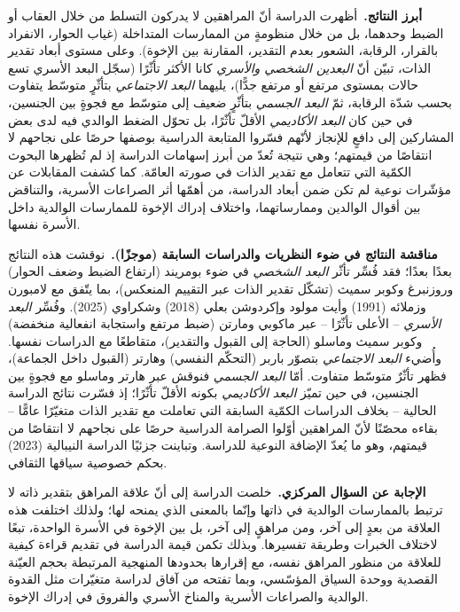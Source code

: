 \medskip
\noindent\textbf{أبرز النتائج.}\ أظهرت الدراسة أنّ المراهقين لا يدركون التسلط من خلال العقاب أو
الضبط وحدهما، بل من خلال منظومةٍ من الممارسات المتداخلة (غياب الحوار، الانفراد بالقرار، الرقابة،
الشعور بعدم التقدير، المقارنة بين الإخوة). وعلى مستوى أبعاد تقدير الذات، تبيّن أنّ \emph{البعدين
الشخصي والأسري} كانا الأكثر تأثّرًا (سجّل البعد الأسري تسع حالات بمستوى مرتفع أو مرتفع جدًّا)،
يليهما \emph{البعد الاجتماعي} بتأثّرٍ متوسّط يتفاوت بحسب شدّة الرقابة، ثمّ \emph{البعد الجسمي}
بتأثّرٍ ضعيف إلى متوسّط مع فجوةٍ بين الجنسين، في حين كان \emph{البعد الأكاديمي} الأقلّ تأثّرًا، بل
تحوّل الضغط الوالدي فيه لدى بعض المشاركين إلى دافعٍ للإنجاز لأنّهم فسّروا المتابعة الدراسية بوصفها
حرصًا على نجاحهم لا انتقاصًا من قيمتهم؛ وهي نتيجة تُعدّ من أبرز إسهامات الدراسة إذ لم تُظهرها
البحوث الكمّية التي تتعامل مع تقدير الذات في صورته العامّة. كما كشفت المقابلات عن مؤشّرات نوعية لم
تكن ضمن أبعاد الدراسة، من أهمّها أثر الصراعات الأسرية، والتناقض بين أقوال الوالدين وممارساتهما،
واختلاف إدراك الإخوة للممارسات الوالدية داخل الأسرة نفسها.

\medskip
\noindent\textbf{مناقشة النتائج في ضوء النظريات والدراسات السابقة (موجزًا).}\ نوقشت هذه النتائج
بعدًا بعدًا؛ فقد فُسِّر تأثّر \emph{البعد الشخصي} في ضوء بومريند (ارتفاع الضبط وضعف الحوار)
وروزنبرغ وكوبر سميث (تشكّل تقدير الذات عبر التقييم المنعكس)، بما يتّفق مع لامبورن وزملائه (1991)
وأيت مولود وإكردوشن بعلي (2018) وشكراوي (2025). وفُسِّر \emph{البعد الأسري} -- الأعلى تأثّرًا --
عبر ماكوبي ومارتن (ضبط مرتفع واستجابة انفعالية منخفضة) وكوبر سميث وماسلو (الحاجة إلى القبول
والتقدير)، متقاطعًا مع الدراسات نفسها. وأُضيء \emph{البعد الاجتماعي} بتصوّر باربر (التحكّم النفسي)
وهارتر (القبول داخل الجماعة)، فظهر تأثّرٌ متوسّط متفاوت. أمّا \emph{البعد الجسمي} فنوقش عبر هارتر
وماسلو مع فجوةٍ بين الجنسين، في حين تميّز \emph{البعد الأكاديمي} بكونه الأقلّ تأثّرًا؛ إذ فسّرت
نتائج الدراسة الحالية -- بخلاف الدراسات الكمّية السابقة التي تعاملت مع تقدير الذات متغيّرًا عامًّا
-- بقاءه محصّنًا لأنّ المراهقين أوّلوا الصرامة الدراسية حرصًا على نجاحهم لا انتقاصًا من قيمتهم،
وهو ما يُعدّ الإضافة النوعية للدراسة. وتباينت جزئيًا الدراسة النيبالية (2023) بحكم خصوصية سياقها
الثقافي.

\medskip
\noindent\textbf{الإجابة عن السؤال المركزي.}\ خلصت الدراسة إلى أنّ علاقة المراهق بتقدير ذاته لا
ترتبط بالممارسات الوالدية في ذاتها وإنّما بالمعنى الذي يمنحه لها؛ ولذلك اختلفت هذه العلاقة من
بعدٍ إلى آخر، ومن مراهقٍ إلى آخر، بل بين الإخوة في الأسرة الواحدة، تبعًا لاختلاف الخبرات وطريقة
تفسيرها. وبذلك تكمن قيمة الدراسة في تقديم قراءة كيفية للعلاقة من منظور المراهق نفسه، مع إقرارها
بحدودها المنهجية المرتبطة بحجم العيّنة القصدية ووحدة السياق المؤسّسي، وبما تفتحه من آفاق لدراسة
متغيّرات مثل القدوة الوالدية والصراعات الأسرية والمناخ الأسري والفروق في إدراك الإخوة.

